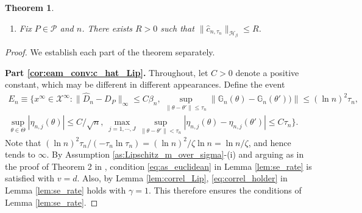 \documentclass[letterpaper,11pt]{article}
\theoremstyle{myplain}
\newtheorem{theorem}{Theorem}[section]
\theoremstyle{mydefinition}
\theoremstyle{myremark}
\renewcommand{\cite}{\citet}
\newcommand{\uni}{\stackrel{u}{\rightarrow}}
\newcommand{\cP}{\mathcal{P}}
\numberwithin{equation}{section}
\numberwithin{figure}{section}
\begin{document}
\begin{appendices}
\begin{theorem}
\begin{enumerate}
$\Omega_{P_n} \uni \Omega,$ and
$D_{P_n}(\theta_n) \to D$. Let
\begin{align}
\hat c_{n,\rho,\tau}(\theta)\equiv \inf_{\lambda \in B^d_{n,\rho}}\hat c_{n,\tau}(\theta+\frac{\lambda\rho}{\sqrt n}).\label{eq:def_chat_nrhotau}
\end{align}	
For $c\ge 0$, let $U_n(\theta_n,c)$ be defined as in \eqref{eq:set_U_NL}. Then,
\begin{align}
\liminf_{n \to \infty} P_n\left( U_n(\theta_n,\hat{c}_{n,\rho,\tau_n})\neq \emptyset \right) \ge 1-\alpha.
\label{eq:validity_mollified_hat_c}
\end{align}
\item \label{cor:eam_conv:ctau_smooth}
Fix $P\in\cP$ and $n$. There exists  $R>0$ such that $\|\hat c_{n,\tau_n}\|_{\mathcal H_\beta}\le R$.
\end{enumerate}
\end{theorem}

\begin{proof} We establish each part of the theorem separately.

 \textbf{Part \ref{cor:eam_conv:c_hat_Lip}.}
Throughout, let $C>0$ denote a positive constant, which may be different in different appearances.
Define the event
\begin{multline}
E_n\equiv\big\{x^\infty\in\mathcal X^\infty:\|\hat D_n-D_{P}\|_{\infty}\le C \beta_n,~\sup_{\|\theta-\theta'\|\le \tau_n}\|\mathbb G_n(\theta)-\mathbb G_n(\theta'))\|\le (\ln n)^2\tau_n,\\
\sup_{\theta\in\Theta}|\eta_{n,j}(\theta)|\le C/\sqrt n,~\max_{j=1,\cdots,J}\sup_{\|\theta-\theta'\|<\tau_n}|\eta_{n,j}(\theta)-\eta_{n,j}(\theta')|\le C\tau_n\big\}.\label{eq:moll_lip1}
\end{multline}	
Note that $(\ln n)^2\tau_n/(-\tau_n\ln\tau_n)=(\ln n)^2/\zeta \ln n=\ln n/\zeta$, and hence tends to $\infty.$ By Assumption \ref{as:Lipschitz_m_over_sigma}-(i) and arguing as in the proof of Theorem 2 in  \cite{Andrews:1994aa}, condition  \eqref{eq:as_euclidean} in Lemma \ref{lem:se_rate} is satisfied with $v=d$. Also, by Lemma \ref{lem:correl_Lip}, \eqref{eq:correl_holder} in Lemma \ref{lem:se_rate} holds with $\gamma=1$. This therefore ensures the conditions of Lemma \ref{lem:se_rate}.


\end{proof}
\end{appendices}
\end{document}
